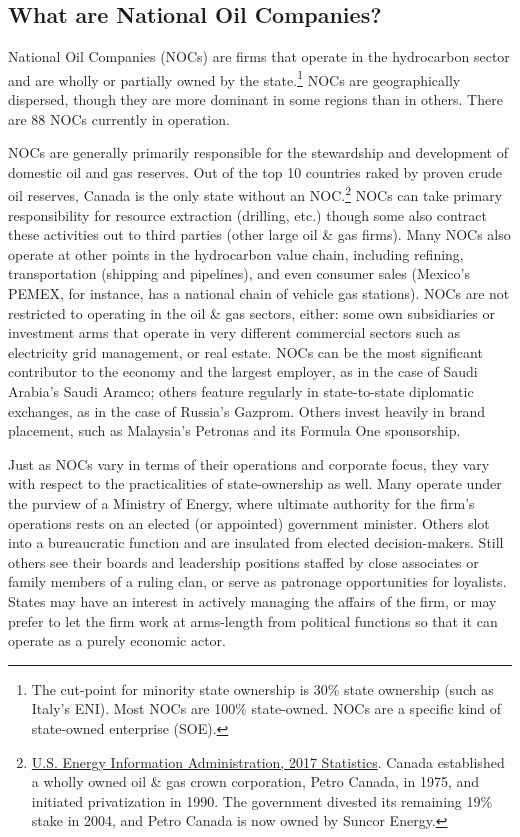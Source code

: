 \documentclass[11pt,]{book}
\begin{document}
\hypertarget{what-are-national-oil-companies}{%
\subsection{What are National Oil Companies?}\label{what-are-national-oil-companies}}

National Oil Companies (NOCs) are firms that operate in the hydrocarbon sector and are wholly or partially owned by the state.\footnote{The cut-point for minority state ownership is 30\% state ownership (such as Italy's ENI). Most NOCs are 100\% state-owned. NOCs are a specific kind of state-owned enterprise (SOE).} NOCs are geographically dispersed, though they are more dominant in some regions than in others. There are 88 NOCs currently in operation.

NOCs are generally primarily responsible for the stewardship and development of domestic oil and gas reserves. Out of the top 10 countries raked by proven crude oil reserves, Canada is the only state without an NOC.\footnote{\href{https://www.eia.gov/beta/international/data/browser/\#/?pa=0000000000000000000008\&c=ruvvvvvfvtvnvv1urvvvvfvvvvvvfvvvou20evvvvvvvvvnvvuvo\&ct=0\&tl_id=5-A\&vs=INTL.57-6-AFG-BB.A\&cy=2018\&vo=0\&v=H\&start=1980}{U.S. Energy Information Administration, 2017 Statistics}. Canada established a wholly owned oil \& gas crown corporation, Petro Canada, in 1975, and initiated privatization in 1990. The government divested its remaining 19\% stake in 2004, and Petro Canada is now owned by Suncor Energy.} NOCs can take primary responsibility for resource extraction (drilling, etc.) though some also contract these activities out to third parties (other large oil \& gas firms). Many NOCs also operate at other points in the hydrocarbon value chain, including refining, transportation (shipping and pipelines), and even consumer sales (Mexico's PEMEX, for instance, has a national chain of vehicle gas stations). NOCs are not restricted to operating in the oil \& gas sectors, either: some own subsidiaries or investment arms that operate in very different commercial sectors such as electricity grid management, or real estate. NOCs can be the most significant contributor to the economy and the largest employer, as in the case of Saudi Arabia's Saudi Aramco; others feature regularly in state-to-state diplomatic exchanges, as in the case of Russia's Gazprom. Others invest heavily in brand placement, such as Malaysia's Petronas and its Formula One sponsorship.

Just as NOCs vary in terms of their operations and corporate focus, they vary with respect to the practicalities of state-ownership as well. Many operate under the purview of a Ministry of Energy, where ultimate authority for the firm's operations rests on an elected (or appointed) government minister. Others slot into a bureaucratic function and are insulated from elected decision-makers. Still others see their boards and leadership positions staffed by close associates or family members of a ruling clan, or serve as patronage opportunities for loyalists. States may have an interest in actively managing the affairs of the firm, or may prefer to let the firm work at arms-length from political functions so that it can operate as a purely economic actor.
\end{document}

